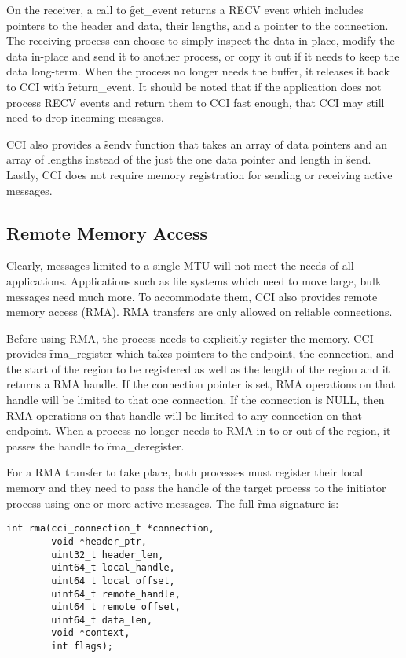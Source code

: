 \documentclass[conference]{IEEEtran}
\begin{document}
On the receiver, a call to \f{get\_event} returns a RECV event which includes pointers to
the header and data, their lengths, and a pointer to the connection. The receiving process
can choose to simply inspect the data in-place, modify the data in-place and send it to
another process, or copy it out if it needs to keep the data long-term. When the process
no longer needs the buffer, it releases it back to CCI with \f{return\_event}. It should
be noted that if the application does not process RECV events and return them to CCI fast
enough, that CCI may still need to drop incoming messages.

CCI also provides a \f{sendv} function that takes an array of data pointers and an array
of lengths instead of the just the one data pointer and length in \f{send}. Lastly, CCI
does not require memory registration for sending or receiving active messages.

\subsection{Remote Memory Access}
Clearly, messages limited to a single MTU will not meet the needs of all applications.
Applications such as file systems which need to move large, bulk messages need much more.
To accommodate them, CCI also provides remote memory access (RMA). RMA transfers are only
allowed on reliable connections.

Before using RMA, the process needs to explicitly register the memory. CCI provides
\f{rma\_register} which takes pointers to the endpoint, the connection, and the start of
the region to be registered as well as the length of the region and it returns a RMA
handle. If the connection pointer is set, RMA operations on that handle will be limited to
that one connection. If the connection is NULL, then RMA operations on that handle will be
limited to any connection on that endpoint.  When a process no longer needs to RMA in to
or out of the region, it passes the handle to \f{rma\_deregister}.

For a RMA transfer to take place, both processes must register their local memory and they
need to pass the handle of the target process to the initiator process using one or more
active messages. The full \f{rma} signature is:

\begin{verbatim}
int rma(cci_connection_t *connection,
        void *header_ptr,
        uint32_t header_len,
        uint64_t local_handle,
        uint64_t local_offset,
        uint64_t remote_handle,
        uint64_t remote_offset,
        uint64_t data_len,
        void *context,
        int flags);
\end{verbatim}
\end{document}
